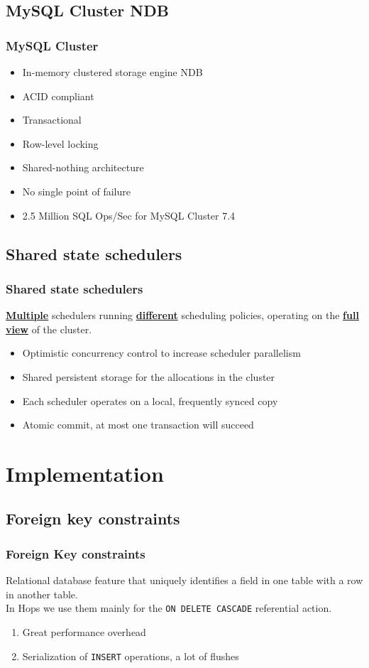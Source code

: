 \documentclass{beamer}
\begin{document}
\subsection{MySQL Cluster NDB}
\begin{frame}
\frametitle{MySQL Cluster}
\begin{itemize}
\item In-memory clustered storage engine NDB
\item ACID compliant
\item Transactional
\item Row-level locking
\item Shared-nothing architecture
\item No single point of failure
\item 2.5 Million SQL Ops/Sec for MySQL Cluster 7.4
\end{itemize}
\end{frame}

\subsection{Shared state schedulers}
\begin{frame}
\frametitle{Shared state schedulers}
\textbf{\underline{Multiple}} schedulers running \textbf{\underline{different}} scheduling
policies, operating on the \textbf{\underline{full view}} of the cluster.
\begin{itemize}
\item Optimistic concurrency control to increase scheduler parallelism
\item Shared persistent storage for the allocations in the cluster
\item Each scheduler operates on a local, frequently synced copy
\item Atomic commit, at most one transaction will succeed
\end{itemize}
\end{frame}

\section{Implementation}
\subsection{Foreign key constraints}
\begin{frame}
\frametitle{Foreign Key constraints}
Relational database feature that uniquely identifies a field in one
table with a row in another table.\\[2em]

In Hops we use them mainly for the \texttt{ON DELETE CASCADE}
referential action.

\begin{enumerate}
\item {\color{red} Great} performance overhead
\item Serialization of \texttt{INSERT} operations, a lot of {\color{red} flushes}
\end{enumerate}
\end{frame}
\end{document}

